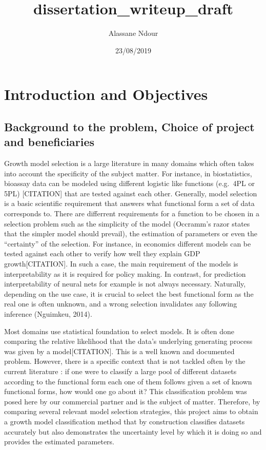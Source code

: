 \documentclass[]{article}
\title{dissertation\_writeup\_draft}
\author{Alassane Ndour}
\date{23/08/2019}
\begin{document}
\maketitle

\hypertarget{introduction-and-objectives}{%
\section{Introduction and
Objectives}\label{introduction-and-objectives}}

\hypertarget{background-to-the-problem-choice-of-project-and-beneficiaries}{%
\subsection{Background to the problem, Choice of project and
beneficiaries}\label{background-to-the-problem-choice-of-project-and-beneficiaries}}

Growth model selection is a large literature in many domains which often
takes into account the specificity of the subject matter. For instance,
in biostatistics, bioassay data can be modeled using different logistic
like functions (e.g.~4PL or 5PL) {[}CITATION{]} that are tested against
each other. Generally, model selection is a basic scientific requirement
that answers what functional form a set of data corresponds to. There
are differrent requirements for a function to be chosen in a selection
problem such as the simplicity of the model (Occramm's razor states that
the simpler model should prevail), the estimation of parameters or even
the ``certainty'' of the selection. For instance, in economics different
models can be tested against each other to verify how well they explain
GDP growth{[}CITATION{]}. In such a case, the main requirement of the
models is interpretability as it is required for policy making. In
contrast, for prediction interpretability of neural nets for example is
not always necessary. Naturally, depending on the use case, it is
crucial to select the best functional form as the real one is often
unknown, and a wrong selection invalidates any following inference
(Nguimkeu, 2014).

Most domains use statistical foundation to select models. It is often
done comparing the relative likelihood that the data's underlying
generating process was given by a model{[}CITATION{]}. This is a well
known and documented problem. However, there is a specific context that
is not tackled often by the current literature : if one were to classify
a large pool of different datasets according to the functional form each
one of them follows given a set of known functional forms, how would one
go about it? This classification problem was posed here by our
commercial partner and is the subject of matter. Therefore, by comparing
several relevant model selection strategies, this project aims to obtain
a growth model classification method that by construction classifies
datasets accurately but also demonstrates the uncertainty level by which
it is doing so and provides the estimated parameters.
\end{document}
